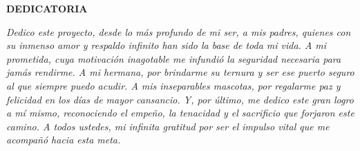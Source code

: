 \begin{center}
    \vspace*{0.5cm}
    {\bfseries DEDICATORIA}
\end{center}
\vspace{1.5cm}

\begin{flushright}
    \begin{minipage}{0.65\textwidth}
        \itshape
        \justifying
        Dedico este proyecto, desde lo más profundo de mi ser, a mis padres, quienes con su inmenso amor y respaldo infinito han sido la base de toda mi vida. A mi prometida, cuya motivación inagotable me infundió la seguridad necesaria para jamás rendirme. A mi hermana, por brindarme su ternura y ser ese puerto seguro al que siempre puedo acudir. A mis inseparables mascotas, por regalarme paz y felicidad en los días de mayor cansancio. Y, por último, me dedico este gran logro a mí mismo, reconociendo el empeño, la tenacidad y el sacrificio que forjaron este camino. A todos ustedes, mi infinita gratitud por ser el impulso vital que me acompañó hacia esta meta.
    \end{minipage}
\end{flushright}

\newpage
